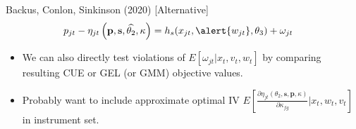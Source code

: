 \documentclass[xcolor=pdftex,dvipsnames,table,mathserif,aspectratio=169]{beamer}
\begin{document}
\begin{frame}{Backus, Conlon, Sinkinson (2020) [Alternative]}
\begin{align*}
 p_{jt} -\eta_{jt}\left(\mathbf{p},\mathbf{s},\widehat{\theta_2},\kappa \right)&= h_s(x_{jt}, \alert{w_{jt}},\theta_3) +  \omega_{jt}
\end{align*}
\begin{itemize}
\item We can also directly test violations of $E[\omega_{jt} | x_t, v_t, w_t]$ by comparing resulting CUE or GEL (or GMM) objective values.
\item Probably want to include approximate optimal IV $E\left[\frac{\partial \eta_{jt}(\theta_2,\mathbf{s},\mathbf{p},\kappa)}{\partial \kappa_{fg}} | x_{t}, w_{t}, v_{t}\right]$ in instrument set.
\end{itemize}
\end{frame}
\end{document}

